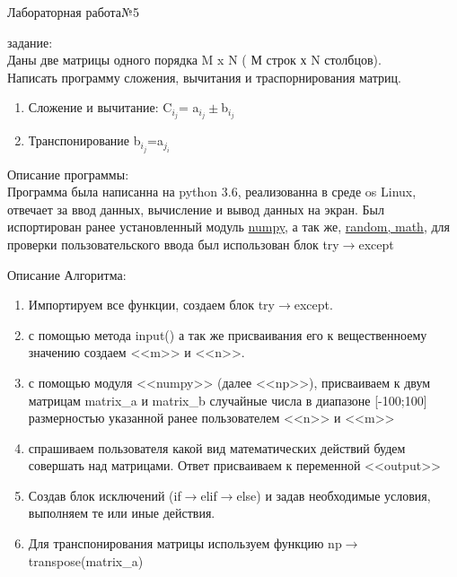 \documentclass[a4paper]{article}
\begin{document}
\newpage
Лабораторная работа№5
\\
    \begin{lab5}
        \begin{center}\underline{\hspace{6cm}}
            задание:\\
            \hspace{1cm}Даны две матрицы одного порядка M x N ( М строк х N столбцов).\\
            Написать программу сложения, вычитания и траспорнирования матриц.\\
            \begin{enumerate}
                \item Сложение и вычитание: C$_i_j$= a$_i_j\pm$b$_i_j$
                \item Транспонирование b$_i_j$=a$_j_i$
            \end{enumerate}
        \end{center}
    \begin{description}
        Описание программы:\\
        \small{Программа была написанна на python 3.6, реализованна в среде os Linux, отвечает за ввод данных, вычисление и вывод данных на экран. Был испортирован ранее установленный модуль \underline{numpy}, а так же, \underline{random, math}, для проверки пользовательского ввода был использован блок try$\to$except}
    \end{description}
    \begin{algoritm}
        Описание Алгоритма:
        \small\begin{enumerate}
            \item Импортируем все функции, создаем блок try$\to$except.
            \item с помощью метода input() а так же присваивания его к вещественноему значению создаем <<m>> и <<n>>.
            \item с помощью модуля <<numpy>> (далее <<np>>), присваиваем к двум матрицам matrix\_a и matrix\_b случайные числа в диапазоне [-100;100] размерностью указанной ранее пользователем <<n>> и <<m>>
            \item спрашиваем пользователя какой вид математических действий будем совершать над матрицами. Ответ присваиваем к переменной <<output>>
            \item Создав блок исключений (if$\to$elif$\to$else) и задав необходимые условия, выполняем те или иные действия.
            \item Для транспонирования матрицы используем функцию np$\to$transpose(matrix\_a)

\end{enumerate}
\end{algoritm}
\end{lab5}
\end{document}
